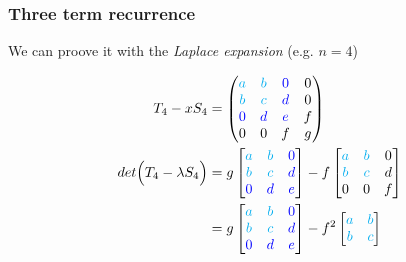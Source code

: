 \documentclass{beamer}
\theoremstyle{definition} \newtheorem{de}{Def}
\theoremstyle{remark} \newtheorem{os}[de]{Remark}
\theoremstyle{plain} \newtheorem{te}[de]{Teo}
\theoremstyle{plain} \newtheorem{co}[de]{Cor}
\theoremstyle{plain} \newtheorem{pr}[de]{Prop}
\theoremstyle{plain} \newtheorem{lem}[de]{Lemm}
\theoremstyle{remark} \newtheorem{rem}[de]{Remark}
\begin{document}
\begin{frame}
  \frametitle{Three term recurrence}

  We can proove it with the \emph{Laplace expansion} (e.g. $n=4$)

  \begin{align*}
    T_4 - x S_4  &= \begin{pmatrix} 
      \textcolor{cyan}{a} & \textcolor{cyan}{b} & \textcolor{blue}{0} & 0\\
      \textcolor{cyan}{b} & \textcolor{cyan}{c} & \textcolor{blue}{d} & 0\\
      \textcolor{blue}{0} & \textcolor{blue}{d} & \textcolor{blue}{e} & f\\
      0 & 0 & f & g
    \end{pmatrix} \\
    det \Big( T_4 - \lambda S_4 \Big) &= g \begin{bmatrix}
      \textcolor{cyan}{a} & \textcolor{cyan}{b} & \textcolor{blue}{0}\\
      \textcolor{cyan}{b} & \textcolor{cyan}{c} & \textcolor{blue}{d}\\
      \textcolor{blue}{0} & \textcolor{blue}{d} & \textcolor{blue}{e}
    \end{bmatrix} -f \begin{bmatrix}
      \textcolor{cyan}{a} & \textcolor{cyan}{b} & 0\\
      \textcolor{cyan}{b} & \textcolor{cyan}{c} & d\\
      0 & 0 & f
    \end{bmatrix}\\
    &= g \begin{bmatrix} 
      \textcolor{cyan}{a} & \textcolor{cyan}{b} & \textcolor{blue}{0}\\
      \textcolor{cyan}{b} & \textcolor{cyan}{c} & \textcolor{blue}{d}\\
      \textcolor{blue}{0} & \textcolor{blue}{d} & \textcolor{blue}{e}
    \end{bmatrix} - f^2 \begin{bmatrix} 
      \textcolor{cyan}{a} & \textcolor{cyan}{b} \\ 
      \textcolor{cyan}{b} & \textcolor{cyan}{c} 
    \end{bmatrix}
  \end{align*}

\end{frame}
\end{document}
